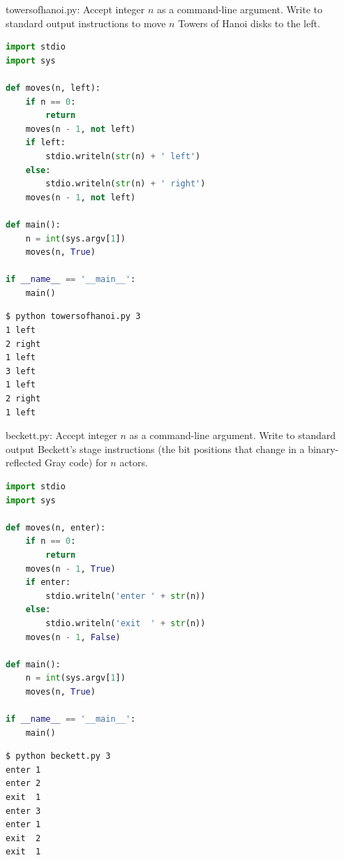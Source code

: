 \documentclass[8pt,a4paper,compress,handout]{beamer}
\begin{document}
\begin{frame}[fragile]
\begin{framed}
\tiny towersofhanoi.py: Accept integer $n$ as a command-line argument. Write to standard output instructions to move $n$ Towers of Hanoi disks to the left.
\end{framed}

\begin{lstlisting}[language=Python]
import stdio
import sys

def moves(n, left):
    if n == 0:
        return
    moves(n - 1, not left)
    if left:
        stdio.writeln(str(n) + ' left')
    else:
        stdio.writeln(str(n) + ' right')
    moves(n - 1, not left)

def main():
    n = int(sys.argv[1])
    moves(n, True)

if __name__ == '__main__':
    main()
\end{lstlisting}

\begin{lstlisting}[language={}]
$ python towersofhanoi.py 3
1 left
2 right
1 left
3 left
1 left
2 right
1 left
\end{lstlisting}
\end{frame}

\begin{frame}[fragile]
\begin{framed}
\tiny beckett.py: Accept integer $n$ as a command-line argument. Write to standard output Beckett's stage instructions (the bit positions that change in a binary-reflected Gray code) for $n$ actors.
\end{framed}

\begin{lstlisting}[language=Python]
import stdio
import sys

def moves(n, enter):
    if n == 0:
        return
    moves(n - 1, True)
    if enter:
        stdio.writeln('enter ' + str(n))
    else:
        stdio.writeln('exit  ' + str(n))
    moves(n - 1, False)

def main():
    n = int(sys.argv[1])
    moves(n, True)

if __name__ == '__main__':
    main()
\end{lstlisting}

\begin{lstlisting}[language={}]
$ python beckett.py 3
enter 1
enter 2
exit  1
enter 3
enter 1
exit  2
exit  1
\end{lstlisting}
\end{frame}
\end{document}
